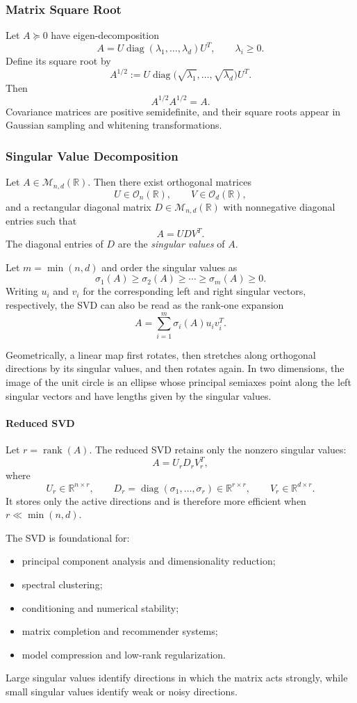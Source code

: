 \documentclass[12pt,oneside]{book}
\numberwithin{equation}{section}
\theoremstyle{definition}
\theoremstyle{plain}
\theoremstyle{remark}
\newcommand{\R}{\mathbb{R}}
\newcommand{\rank}{\operatorname{rank}}
\newcommand{\diag}{\operatorname{diag}}
\begin{document}
\subsubsection{Matrix Square Root}
Let $A\succeq0$ have eigen-decomposition
\[
A=U\diag(\lambda_1,\ldots,\lambda_d)U^T,
\qquad \lambda_i\geq0.
\]
Define its square root by
\[
A^{1/2}:=
U\diag\bigl(\sqrt{\lambda_1},\ldots,\sqrt{\lambda_d}\bigr)U^T.
\]
Then
\[
A^{1/2}A^{1/2}=A.
\]
Covariance matrices are positive semidefinite, and their square roots appear in Gaussian sampling and whitening transformations.

\subsubsection{Singular Value Decomposition}
Let $A\in\mathcal{M}_{n,d}(\R)$. Then there exist orthogonal matrices
\[
U\in\mathcal{O}_n(\R),
\qquad
V\in\mathcal{O}_d(\R),
\]
and a rectangular diagonal matrix $D\in\mathcal{M}_{n,d}(\R)$ with nonnegative diagonal entries such that
\[
A=UDV^T.
\]
The diagonal entries of $D$ are the \emph{singular values} of $A$.

Let $m=\min(n,d)$ and order the singular values as
\[
\sigma_1(A)\geq\sigma_2(A)\geq\cdots
\geq\sigma_m(A)\geq0.
\]
Writing $u_i$ and $v_i$ for the corresponding left and right singular vectors, respectively, the SVD can also be read as the rank-one expansion
\[
A=\sum_{i=1}^m\sigma_i(A)u_iv_i^T.
\]

Geometrically, a linear map first rotates, then stretches along orthogonal directions by its singular values, and then rotates again. In two dimensions, the image of the unit circle is an ellipse whose principal semiaxes point along the left singular vectors and have lengths given by the singular values.

\paragraph{Reduced SVD}
Let $r=\rank(A)$. The reduced SVD retains only the nonzero singular values:
\[
A=U_rD_rV_r^T,
\]
where
\[
U_r\in\R^{n\times r},
\qquad
D_r=\diag(\sigma_1,\ldots,\sigma_r)\in\R^{r\times r},
\qquad
V_r\in\R^{d\times r}.
\]
It stores only the active directions and is therefore more efficient when $r\ll\min(n,d)$.

The SVD is foundational for:
\begin{itemize}
    \item principal component analysis and dimensionality reduction;
    \item spectral clustering;
    \item conditioning and numerical stability;
    \item matrix completion and recommender systems;
    \item model compression and low-rank regularization.
\end{itemize}
Large singular values identify directions in which the matrix acts strongly, while small singular values identify weak or noisy directions.
\end{document}
